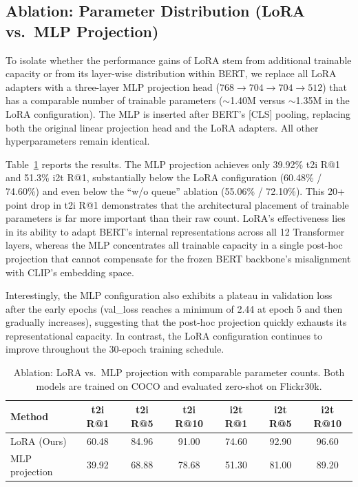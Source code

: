 \documentclass[10pt,leqno]{amsart}
\begin{document}
\subsection{Ablation: Parameter Distribution (LoRA vs.\ MLP Projection)}

To isolate whether the performance gains of LoRA stem from additional trainable capacity or from its layer-wise distribution within BERT, we replace all LoRA adapters with a three-layer MLP projection head ($768 \to 704 \to 704 \to 512$) that has a comparable number of trainable parameters (${\sim}$1.40M versus ${\sim}$1.35M in the LoRA configuration). The MLP is inserted after BERT's [CLS] pooling, replacing both the original linear projection head and the LoRA adapters. All other hyperparameters remain identical.

Table~\ref{tab:ablation_mlp} reports the results. The MLP projection achieves only 39.92\% t2i R@1 and 51.3\% i2t R@1, substantially below the LoRA configuration (60.48\% / 74.60\%) and even below the ``w/o queue'' ablation (55.06\% / 72.10\%). This 20+ point drop in t2i R@1 demonstrates that the architectural placement of trainable parameters is far more important than their raw count. LoRA's effectiveness lies in its ability to adapt BERT's internal representations across all 12 Transformer layers, whereas the MLP concentrates all trainable capacity in a single post-hoc projection that cannot compensate for the frozen BERT backbone's misalignment with CLIP's embedding space.

Interestingly, the MLP configuration also exhibits a plateau in validation loss after the early epochs (val\_loss reaches a minimum of 2.44 at epoch 5 and then gradually increases), suggesting that the post-hoc projection quickly exhausts its representational capacity. In contrast, the LoRA configuration continues to improve throughout the 30-epoch training schedule.

\begin{table}[h]
\centering
\caption{Ablation: LoRA vs.\ MLP projection with comparable parameter counts. Both models are trained on COCO and evaluated zero-shot on Flickr30k.}
\label{tab:ablation_mlp}
\begin{tabular}{lcccccc}
\toprule
Method & t2i R@1 & t2i R@5 & t2i R@10 & i2t R@1 & i2t R@5 & i2t R@10 \\
\midrule
LoRA (Ours) & 60.48 & 84.96 & 91.00 & 74.60 & 92.90 & 96.60 \\
MLP projection & 39.92 & 68.88 & 78.68 & 51.30 & 81.00 & 89.20 \\
\bottomrule
\end{tabular}
\end{table}
\end{document}
